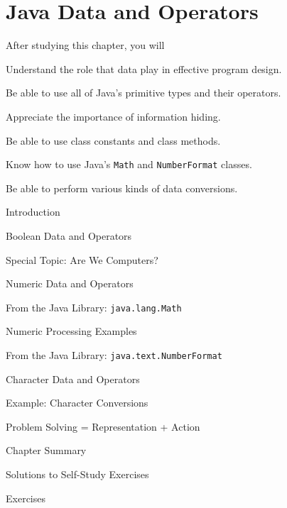 
\setcounter{chapter}{4}
\setcounter{SSTUDYcount}{1}
\chapter{Java Data and Operators}
\label{chapter-models}


\CObegin
{}

\noindent After studying this chapter, you will
\begin{COBL}
\item  Understand the role that data play in effective program design.
\item  Be able to use all of Java's primitive types and their operators.
\item  Appreciate the importance of information hiding.
\item  Be able to use class constants and class methods.
\item  Know how to use Java's {\tt Math} and {\tt NumberFormat} classes.
\item  Be able to perform various kinds of data conversions.
\end{COBL}


\begin{COL}
\item Introduction
\item Boolean Data and Operators
\item[] {{\color{cyan}Special Topic:} Are We Computers?}
\item Numeric Data and Operators
\item From the Java Library: {\tt java.lang.Math}
\item Numeric Processing Examples
\item From the Java Library: {\tt java.text.NumberFormat}
\item Character Data and Operators
\item Example: Character Conversions
\item Problem Solving  = Representation  + Action
\par\small\item[] Chapter Summary
\par\small\item[] Solutions to Self-Study Exercises
\par\small\item[] Exercises
\end{COL}
\COend


